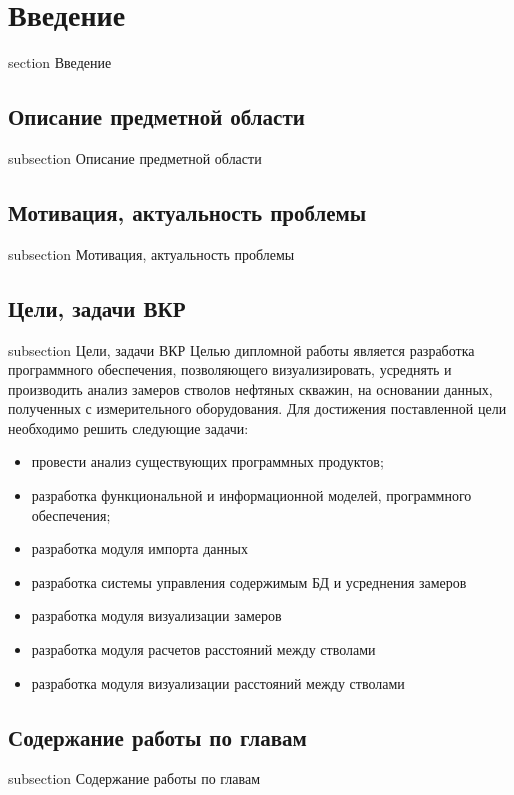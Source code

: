 \newpage
\section*{Введение}
 {section} {Введение}
\subsection*{Описание предметной области}
 {subsection} {Описание предметной области}

\subsection*{Мотивация, актуальность проблемы}
 {subsection} {Мотивация, актуальность проблемы}

\subsection*{Цели, задачи ВКР}
 {subsection} {Цели, задачи ВКР}
Целью дипломной работы является разработка программного обеспечения, позволяющего визуализировать, усреднять и производить анализ замеров стволов нефтяных скважин,
на основании данных, полученных с измерительного оборудования. Для достижения поставленной цели необходимо решить следующие задачи:
\begin{itemize}
  \item провести анализ существующих программных продуктов;
  \item разработка функциональной и информационной моделей, программного обеспечения;
  \item разработка модуля импорта данных
  \item разработка системы управления содержимым БД и усреднения замеров
  \item разработка модуля визуализации замеров
  \item разработка модуля расчетов расстояний между стволами
  \item разработка модуля визуализации расстояний между стволами
\end{itemize}

\subsection*{Содержание работы по главам}
 {subsection} {Содержание работы по главам}
